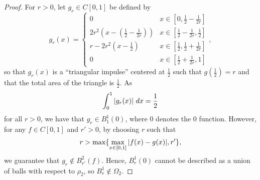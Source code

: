 \begin{proof}
    For $r > 0$, let $g_r \in C[0,1]$ be defined by
    \[
        g_r(x) =
        \begin{cases}
            0 & x \in [0, \tfrac{1}{2} - \tfrac{1}{2r}] \\
            2r^2(x - (\tfrac{1}{2} - \tfrac{1}{2r})) & x \in [\tfrac{1}{2} - \tfrac{1}{2r}, \tfrac{1}{2}] \\
            r - 2r^2(x - \tfrac{1}{2}) & x \in [\tfrac{1}{2},\tfrac{1}{2} + \tfrac{1}{2r}] \\
            0 & x \in [\tfrac{1}{2} + \tfrac{1}{2r}, 1]
        \end{cases},
    \]
    so that $g_r(x)$ is a ``triangular impulse'' centered at $\frac{1}{2}$ such
    that $g(\frac{1}{2}) = r$ and that the total area of the triangle is
    $\frac{1}{2}$.
    As
    \[
        \int_{0}^{1} |g_r(x)| \ dx = \frac{1}{2}
    \]
    for all $r > 0$, we have that $g_r \in B_1^1(0)$, where 0 denotes the 0
    function. However, for any $f \in C[0,1]$ and $r' > 0$, by choosing $r$ such
    that
    \[
        r > \max\{\max_{x \in [0,1]} |f(x) - g(x)|, r'\},
    \]
    we guarantee that $g_r \notin B_{r'}^2(f)$. Hence, $B_r^1(0)$ cannot be
    described as a union of balls with respect to $\rho_2$, so $B_r^1 \notin
    \Omega_2$.
\end{proof}
